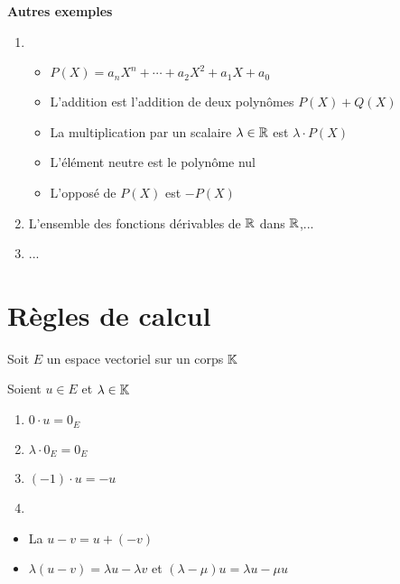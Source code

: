 \begin{frame}
\centerline{\textbf{Autres exemples}}
\bigskip

\pause
\begin{enumerate}
  \item {}
\pause
    \begin{itemize}
      \item $P(X) = a_nX^n+\cdots+a_2X^2+a_1X+a_0$
      \item L'addition est l'addition de deux polynômes $P(X)+Q(X)$
      \item La multiplication par un scalaire $\lambda \in \mathbb{R}$ est $\lambda \cdot P(X)$
      \item L'élément neutre est le polynôme nul
      \item L'opposé de $P(X)$ est $-P(X)$
    \end{itemize}
\pause 
  \item 
\pause  

  L'ensemble des fonctions dérivables de $\mathbb{R}$ dans $\mathbb{R}$,...
\pause 
  \item ...
\end{enumerate}
\end{frame}



\section{Règles de calcul}

\begin{frame}

Soit $E$ un espace vectoriel sur un corps $\mathbb{K}$

Soient $u \in E$ et $\lambda \in \mathbb{K}$
\pause
\begin{proposition}

 \begin{enumerate}\setlength{\itemsep}{6pt}
 \item $0 \cdot u = 0_E$
\pause 
 \item $\lambda \cdot 0_E = 0_E$
\pause 
 \item $(-1)\cdot u = -u$
\pause 
 \item {}
 \end{enumerate} 
\end{proposition}

\bigskip
\pause
\begin{itemize}
  \item La  $u-v = u+(-v)$
\pause  
  \item $\lambda (u-v)=\lambda u -\lambda v$
 \quad et \quad  $(\lambda -\mu)u=\lambda u-\mu u$
\end{itemize}

\end{frame}





